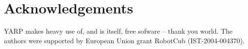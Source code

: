 
\section{Acknowledgements}

YARP makes heavy use of, and is itself, free sofware -- thank
you world.  The authors were supported by European Union
grant RobotCub (IST-2004-004370).





